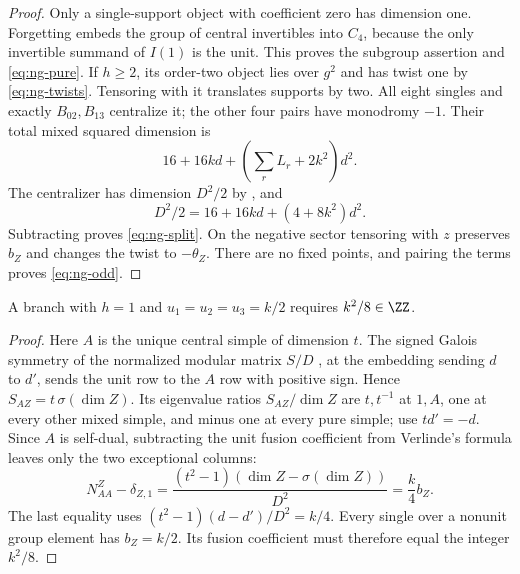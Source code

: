 \begin{proof}
Only a single-support object with coefficient zero has dimension one.
Forgetting embeds the group of central invertibles into $C_4$, because
the only invertible summand of $I(1)$ is the unit. This proves the
subgroup assertion and \eqref{eq:ng-pure}. If $h\ge2$, its order-two
object lies over $g^2$ and has twist one by \eqref{eq:ng-twists}.
Tensoring with it translates supports by two. All eight singles and
exactly $B_{02},B_{13}$ centralize it; the other four pairs have monodromy
$-1$. Their total mixed squared dimension is
\[
 16+16kd+(\sum_rL_r+2k^2)d^2.
\]
The centralizer has dimension $D^2/2$ by
\cite[Theorem 3.14]{DGNO}, and
\[
 D^2/2=16+16kd+(4+8k^2)d^2.
\]
Subtracting proves \eqref{eq:ng-split}. On the negative sector tensoring
with $z$ preserves $b_Z$ and changes the twist to $-\theta_Z$.
There are no fixed points, and pairing the terms proves
\eqref{eq:ng-odd}.
\end{proof}

\begin{lemma}\label{lem:ng-galois}
A branch with $h=1$ and $u_1=u_2=u_3=k/2$ requires $k^2/8\in\ZZ$.
\end{lemma}
\begin{proof}
Here $A$ is the unique central simple of dimension $t$.
The signed Galois symmetry of the normalized modular matrix $S/D$
\cite[(2.13)]{BNRW}, at the embedding sending $d$ to $d'$, sends the
unit row to the $A$ row with positive sign. Hence
$S_{AZ}=t\,\sigma(\dim Z)$. Its eigenvalue ratios
$S_{AZ}/\dim Z$ are $t,t^{-1}$ at $1,A$, one at every other mixed
simple, and minus one at every pure simple; use $td'=-d$.
Since $A$ is self-dual, subtracting the unit fusion coefficient from
Verlinde's formula leaves only the two exceptional columns:
\[
 N_{AA}^Z-\delta_{Z,1}
 =\frac{(t^2-1)(\dim Z-\sigma(\dim Z))}{D^2}
 =\frac{k}{4}b_Z.
\]
The last equality uses $(t^2-1)(d-d')/D^2=k/4$.
Every single over a nonunit group element has $b_Z=k/2$.
Its fusion coefficient must therefore equal the integer $k^2/8$.
\end{proof}


